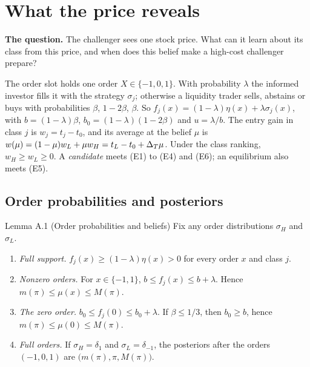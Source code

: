 \chapter{What the price reveals}\label{ch:beliefs}

\begin{chapterplan}
\textbf{The question.} The challenger sees one stock price. What can it learn about its class from this price, and when does this belief make a high-cost challenger prepare?
\end{chapterplan}

The order slot holds one order \(X\in\{-1,0,1\}\). With probability \(\lambda\) the informed investor fills it with the strategy \(\sigma_j\); otherwise a liquidity trader sells, abstains or buys with probabilities \(\beta\), \(1-2\beta\), \(\beta\). So \(f_j(x)=(1-\lambda)\eta(x)+\lambda\sigma_j(x)\), with \(b=(1-\lambda)\beta\), \(b_0=(1-\lambda)(1-2\beta)\) and \(u=\lambda/b\). The entry gain in class \(j\) is \(w_j=t_j-t_0\), and its average at the belief \(\mu\) is \(w(\mu)=(1-\mu)w_L+\mu w_H=t_L-t_0+\Delta_T\mu\). Under the class ranking, \(w_H\ge w_L\ge0\). A \emph{candidate} meets (E1) to (E4) and (E6); an equilibrium also meets (E5).

\section{Order probabilities and posteriors}\label{sec:beliefs-lemma}

\begin{paperresult}{Lemma A.1 (Order probabilities and beliefs)}
Fix any order distributions \(\sigma_H\) and \(\sigma_L\).
\begin{enumerate}[label=(\alph*),leftmargin=2em]
\item \emph{Full support.} \(f_j(x)\ge(1-\lambda)\eta(x)>0\) for every order \(x\) and class \(j\).
\item \emph{Nonzero orders.} For \(x\in\{-1,1\}\), \(b\le f_j(x)\le b+\lambda\). Hence \(m(\pi)\le\mu(x)\le M(\pi)\).
\item \emph{The zero order.} \(b_0\le f_j(0)\le b_0+\lambda\). If \(\beta\le1/3\), then \(b_0\ge b\), hence \(m(\pi)\le\mu(0)\le M(\pi)\).
\item \emph{Full orders.} If \(\sigma_H=\delta_1\) and \(\sigma_L=\delta_{-1}\), the posteriors after the orders \((-1,0,1)\) are \(\bigl(m(\pi),\pi,M(\pi)\bigr)\).
\end{enumerate}
\end{paperresult}

